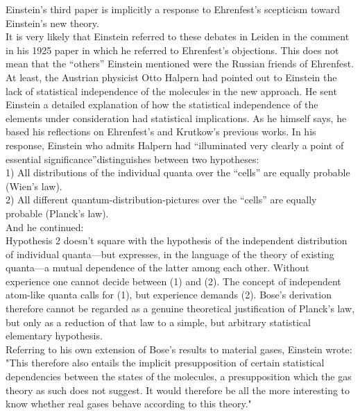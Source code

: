 \documentclass[12pt, letterpaper]{article}
\begin{document}
    Einstein’s third paper is implicitly a response to Ehrenfest’s
    scepticism toward Einstein’s new theory. \\

    It is very likely that Einstein referred to these debates in Leiden in the comment in his 1925 paper in which he referred to Ehrenfest’s objections. This
    does not mean that the “others” Einstein mentioned were the Russian friends of
    Ehrenfest. At least, the Austrian physicist Otto Halpern had pointed out to Einstein the lack of statistical independence of the molecules in the new approach.
    He sent Einstein a detailed explanation of how the statistical independence of
    the elements under consideration had statistical implications. As he himself
    says, he based his reflections on Ehrenfest’s and Krutkow’s previous works. In
    his response, Einstein who admits Halpern had “illuminated very clearly a point
    of essential significance”distinguishes between two hypotheses: \\ 

        1) All distributions of the individual quanta over the “cells” are
        equally probable (Wien’s law). \\ 
        2) All different quantum-distribution-pictures over the “cells” are
        equally probable (Planck’s law). \\

    And he continued:\\
    
    Hypothesis 2 doesn’t square with the hypothesis of the independent
    distribution of individual quanta—but expresses, in the language of
    the theory of existing quanta—a mutual dependence of the latter
    among each other.
    Without experience one cannot decide between (1) and (2). The
    concept of independent atom-like quanta calls for (1), but experience demands (2). Bose’s derivation therefore cannot be regarded
    as a genuine theoretical justification of Planck’s law, but only as a
    reduction of that law to a simple, but arbitrary statistical elementary
    hypothesis. \\ 

    Referring to his own extension of Bose’s results to material gases, Einstein
    wrote: \\ 

    "This therefore also entails the implicit presupposition of certain statistical dependencies between the states of the molecules, a presupposition which the gas theory as such does not suggest. It would
    therefore be all the more interesting to know whether real gases behave according to this theory." \\ 
    
\end{document}
